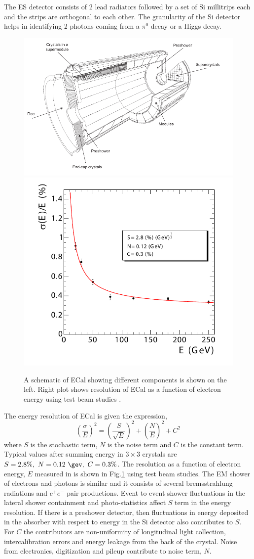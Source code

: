 The ES detector consists of 2 lead radiators followed by a set of Si millitrips each and the strips are orthogonal to each other.
The granularity of the Si detector helps in identifying 2 photons coming from a $\pi^0$ decay or a Higgs decay.
\begin{figure}[h!]
\centering
\includegraphics[width=0.59\linewidth]{../Figures/Chap2/Ecal_schematic}
\includegraphics[width=0.4\linewidth]{../Figures/Chap2/ecalResolution}
\captionsetup{width=.95\linewidth}
\caption[ECal schematic and resolution]{A schematic of ECal showing different components is shown on the left. 
Right plot shows resolution of ECal as a function of electron energy using test beam studies \cite{Chatrchyan:2008aa}.}
\label{fig:Ecal_sche_res}
\end{figure}

\noindent The energy resolution of ECal is given the expression,
\begin{equation}
\label{eqn:ecalReso}
{\left(\frac{\sigma}{E}\right)}^2  =  {\left(\frac{S}{\sqrt{E}}\right)}^2 + {\left(\frac{N}{E}\right)}^2 + C^2
\end{equation}
where $S$ is the stochastic term, $N$ is the noise term and $C$ is the constant term. Typical values after summing energy in $3\times3$ 
crystals are $S=2.8\%,\ N=0.12\ \gev,\ C=0.3\%$. The resolution as a function of electron energy, $E$ measured in \gev is shown in 
Fig.\ref{fig:Ecal_sche_res} using test beam studies. The EM shower of electrons and photons is similar and it consists of several 
bremsstrahlung radiations and $e^+e^-$ pair productions. Event to event shower fluctuations in the lateral shower containment and
photo-statistics affect $S$ term in the energy resolution. If there is a preshower detector, then fluctuations in energy deposited in the 
absorber with respect to energy in the Si detector also contributes to $S$. For $C$ the contributors are non-uniformity of longitudinal 
light collection, intercalibration errors and energy leakage from the back of the crystal. Noise from electronics, digitization and pileup 
contribute to noise term, $N$.

